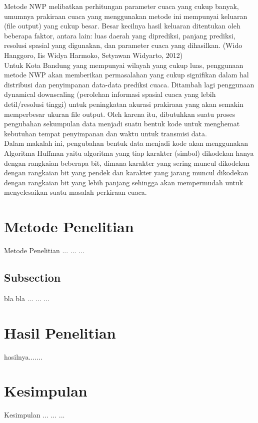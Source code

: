 \documentclass[journal]{IEEEtran}
\begin{document}
\hspace*{1cm}Metode NWP melibatkan perhitungan parameter cuaca yang cukup banyak, umumnya prakiraan cuaca yang menggunakan metode ini mempunyai keluaran (file output) yang cukup besar. Besar kecilnya hasil keluaran ditentukan oleh beberapa faktor, antara lain: luas daerah yang diprediksi, panjang prediksi, resolusi spasial yang digunakan, dan parameter cuaca yang dihasilkan. (Wido Hanggoro, Iis Widya Harmoko, Setyawan Widyarto, 2012)\\
\hspace*{1cm}Untuk Kota Bandung yang mempunyai wilayah yang cukup luas, penggunaan metode NWP akan memberikan permasalahan yang cukup signifikan dalam hal distribusi dan penyimpanan data-data prediksi cuaca. Ditambah lagi penggunaan dynamical downscaling (perolehan informasi spasial cuaca yang lebih detil/resolusi tinggi) untuk peningkatan akurasi prakiraan yang akan semakin memperbesar ukuran file output. Oleh karena itu, dibutuhkan suatu proses pengubahan sekumpulan data menjadi suatu bentuk kode untuk menghemat kebutuhan tempat penyimpanan dan waktu untuk transmisi data.\\
\hspace*{1cm}Dalam makalah ini, pengubahan bentuk data menjadi kode akan menggunakan Algoritma Huffman yaitu algoritma yang tiap karakter (simbol) dikodekan hanya dengan rangkaian beberapa bit, dimana karakter yang sering muncul dikodekan dengan rangkaian bit yang pendek dan karakter yang jarang muncul dikodekan dengan rangkaian bit yang lebih panjang sehingga akan mempermudah untuk menyelesaikan suatu masalah perkiraan cuaca.

\section{Metode Penelitian}
Metode Penelitian ... ... ...

\subsection{Subsection}
bla bla ... ... ...

\section{Hasil Penelitian}
hasilnya.......


\section{Kesimpulan}
Kesimpulan ... ... ...
\end{document}
